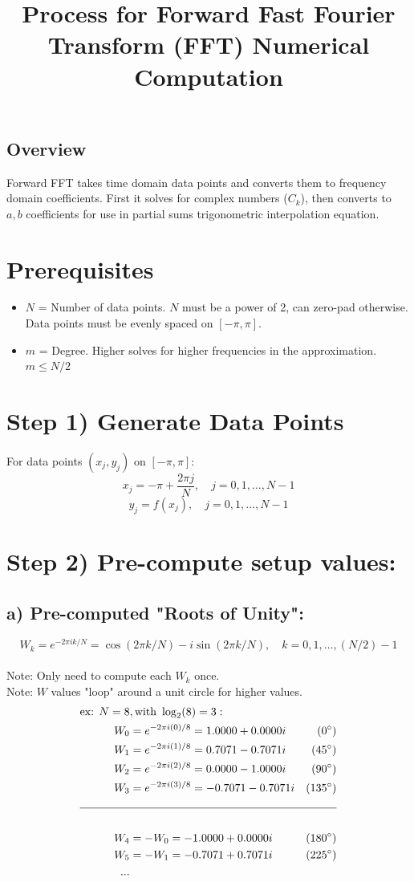 \documentclass[12pt]{article}
\title{Process for Forward Fast Fourier Transform (FFT) Numerical Computation}
\author{}
\date{}
\begin{document}
\maketitle
\subsection*{Overview}
Forward FFT takes time domain data points and converts them to frequency domain coefficients. First it solves for complex numbers ($C_k$), then converts to $a,b$ coefficients for use in partial sums trigonometric interpolation equation. 

\section*{Prerequisites}
\begin{itemize}
    \item $N$ = Number of data points. $N$ must be a power of 2, can zero-pad otherwise. Data points must be evenly spaced on $[-\pi,\pi]$.
    \item $m$ = Degree. Higher solves for higher frequencies in the approximation. $m \leq N/2$
\end{itemize}

\section*{Step 1) Generate Data Points}
For data points $(x_j,y_j)$ on $[-\pi,\pi]$:
\[x_j = -\pi + \frac{2\pi j}{N}, \quad j=0,1,\ldots,N-1\]
\[y_j = f(x_j), \quad j=0,1,\ldots,N-1\]

\section*{Step 2) Pre-compute setup values:}
\subsection*{a) Pre-computed "Roots of Unity":}
\[W_k = e^{-2\pi ik/N} = \cos(2\pi k/N) - i\sin(2\pi k/N), \quad k=0,1,\ldots,(N/2)-1\]
\\
Note: Only need to compute each $W_k$ once.\\
Note: $W$ values "loop" around a unit circle for higher values.\\
\begin{align*}
\text{ex: } N=8&, \text{with } \log_2(8)= 3: \\
W_0 &= e^{-2\pi i(0)/8} = 1.0000+0.0000i &(0^\circ)\\
W_1 &= e^{-2\pi i(1)/8} = 0.7071-0.7071i &(45^\circ)\\
W_2 &= e^{-2\pi i(2)/8} = 0.0000-1.0000i &(90^\circ)\\
W_3 &= e^{-2\pi i(3)/8} = -0.7071-0.7071i &(135^\circ)\\
\cline{1-3}\\
W_4 &= -W_0 = -1.0000+0.0000i &(180^\circ)\\
W_5 &= -W_1 = -0.7071+0.7071i &(225^\circ)\\
...
\end{align*}
\end{document}
